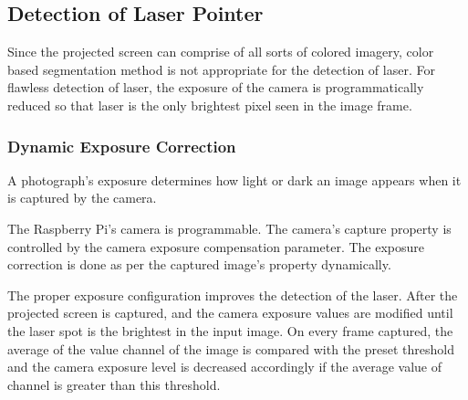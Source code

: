 \documentclass[12pt, a4paper]{article}
\begin{document}
\subsection{Detection of Laser Pointer}
	Since the projected screen can comprise of all sorts of colored imagery, color based segmentation method is not appropriate for the detection of laser. For flawless detection of laser, the exposure of the camera is programmatically reduced so that laser is the only brightest pixel seen in the image frame. 
	\subsubsection{Dynamic Exposure Correction}
	A photograph's exposure determines how light or dark an image appears when it is captured by the camera. 
	
	The Raspberry Pi's camera is programmable. The camera's capture property is controlled by the camera exposure compensation parameter. The exposure correction is done as per the captured image's property dynamically. 
	
	The proper exposure configuration improves the detection of the laser. After the projected screen is captured, and the camera exposure values are modified until the laser spot is the brightest in the input image. On every frame captured, the average of the value channel of the image is compared with the preset threshold and the camera exposure level is decreased accordingly if the average value of channel is greater than this threshold.
	
	
\end{document}
